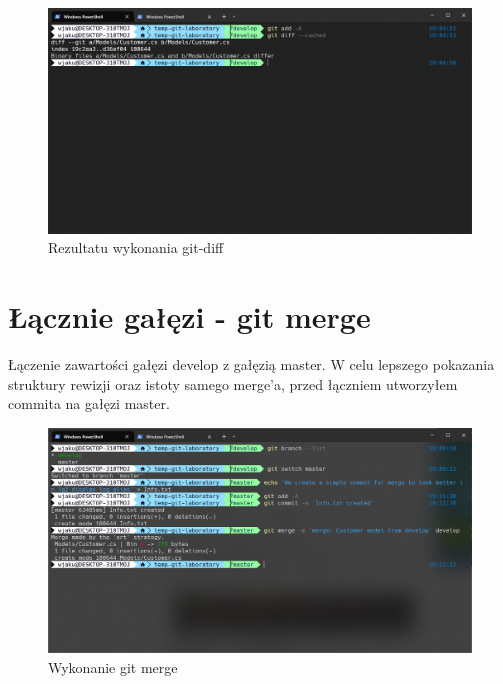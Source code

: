 \documentclass{article}
\begin{document}
\vspace*{\fill}
\begin{figure}[!h]
    \caption{Rezultatu wykonania git-diff}
    \centerline{\includegraphics [scale=0.5]{git-diff.PNG}}
    \label{fig:label}
\end{figure}
\vspace*{\fill}
\newpage

\section{Łącznie gałęzi - git merge}

Łączenie zawartości gałęzi develop z gałęzią master. W celu lepszego pokazania struktury rewizji oraz istoty samego merge'a, przed łączniem utworzyłem commita na gałęzi master.

\vspace*{\fill}
\begin{figure}[!h]
    \caption{Wykonanie git merge}
    \centerline{\includegraphics [scale=0.5]{merge.PNG}}
    \label{fig:label}
\end{figure}
\vspace*{\fill}
\newpage
\end{document}
